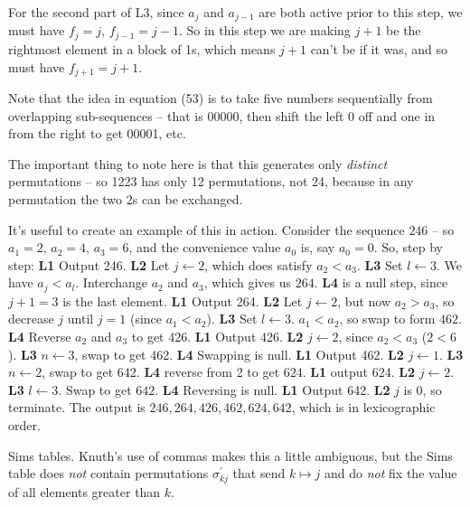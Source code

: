 For the second part of L3, since $a_j$ and $a_{j-1}$ are both active
prior to this step, we must have $f_j = j$, $f_{j-1} = j - 1$.  So
in this step we are making $j+1$ be the rightmost element in a block of 1s,
which means $j+1$ can't be if it was, and so must have $f_{j+1} = j + 1$.


\noindent [p 302] Note that the idea in equation (53) is to take five
numbers sequentially from overlapping sub-sequences -- that is
00000, then shift the left 0 off and one in from the right to get 00001,
etc.


 The important thing to note here is that
this generates only {\it distinct} permutations -- so 1223 has only 12
permutations, not 24, because in any permutation the two 2s can be
exchanged.

It's useful to create an example of this
in action.  Consider the sequence $246$ -- so $a_1 = 2$, $a_2 = 4$,
$a_3 = 6$, and the convenience value $a_0$ is, say $a_0 = 0$.
So, step by step:\hfil\break
{\bf L1} Output 246.\hfil\break
{\bf L2} Let $j \leftarrow 2$, which does satisfy $a_2 < a_3$.\hfil\break
{\bf L3} Set $l \leftarrow 3$.  We have $a_j < a_l$.  Interchange
  $a_2$ and $a_3$, which gives us $264$.\hfil\break
{\bf L4} is a null step, since $j + 1 = 3$ is the last element.\hfil\break
{\bf L1} Output 264.\hfil\break
{\bf L2} Let $j \leftarrow 2$, but now $a_2 > a_3$, so decrease
  $j$ until $j = 1$ (since $a_1 < a_2$).\hfil\break
{\bf L3} Set $l \leftarrow 3$.  $a_1 < a_2$, so swap to form
 $462$.\hfil\break
{\bf L4} Reverse $a_2$ and $a_3$ to get 426.\hfil\break
{\bf L1} Output 426.\hfil\break
{\bf L2} $j \leftarrow 2$, since $a_2 < a_3$ ($2 < 6$).\hfil\break
{\bf L3} $n \leftarrow 3$, swap to get 462.\hfil\break
{\bf L4} Swapping is null.\hfil\break
{\bf L1} Output 462.\hfil\break
{\bf L2} $j \leftarrow 1$.\hfil\break
{\bf L3} $n \leftarrow 2$, swap to get $642$.\hfil\break
{\bf L4} reverse from 2 to get $624$.\hfil\break
{\bf L1} output 624.\hfil\break
{\bf L2} $j \leftarrow 2$.\hfil\break
{\bf L3} $l \leftarrow 3$.  Swap to get $642$.\hfil\break
{\bf L4} Reversing is null.\hfil\break
{\bf L1} Output 642.\hfil\break
{\bf L2} $j$ is 0, so terminate.\hfil\break
The output is ${246, 264, 426, 462, 624, 642}$, which is in lexicographic
order.


\noindent [p 327] Sims tables.\hfil\break
Knuth's use of commas makes this a little ambiguous, but the Sims table
does {\it not} contain permutations $\sigma^{\prime}_{kj}$ that send
$k \mapsto j$ and do {\it not} fix the value of all elements greater than $k$.

